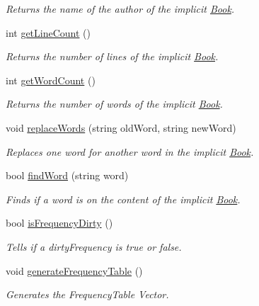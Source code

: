 \begin{DoxyCompactItemize}
\begin{DoxyCompactList}\small\item\em Returns the name of the author of the implicit \hyperlink{class_book}{Book}. \end{DoxyCompactList}\item 
int \hyperlink{class_book_a97ccb67ee2b4b0d553163d2301d9a00e}{get\+Line\+Count} ()
\begin{DoxyCompactList}\small\item\em Returns the number of lines of the implicit \hyperlink{class_book}{Book}. \end{DoxyCompactList}\item 
int \hyperlink{class_book_a29418f8797be1143747a449445f064a9}{get\+Word\+Count} ()
\begin{DoxyCompactList}\small\item\em Returns the number of words of the implicit \hyperlink{class_book}{Book}. \end{DoxyCompactList}\item 
void \hyperlink{class_book_aaf182e24b86624b6ff54fba2581094a4}{replace\+Words} (string old\+Word, string new\+Word)
\begin{DoxyCompactList}\small\item\em Replaces one word for another word in the implicit \hyperlink{class_book}{Book}. \end{DoxyCompactList}\item 
bool \hyperlink{class_book_af3ceb5ae5d66adf4d594cac8d29294fc}{find\+Word} (string word)
\begin{DoxyCompactList}\small\item\em Finds if a word is on the content of the implicit \hyperlink{class_book}{Book}. \end{DoxyCompactList}\item 
bool \hyperlink{class_book_aec01aa24087b313f36cc0fe3c4664f84}{is\+Frequency\+Dirty} ()
\begin{DoxyCompactList}\small\item\em Tells if a dirty\+Frequency is true or false. \end{DoxyCompactList}\item 
void \hyperlink{class_book_a8d232eaeb4207707d77bc18e6dd467cd}{generate\+Frequency\+Table} ()
\begin{DoxyCompactList}\small\item\em Generates the Frequency\+Table Vector. \end{DoxyCompactList}\item 

\end{DoxyCompactItemize}
